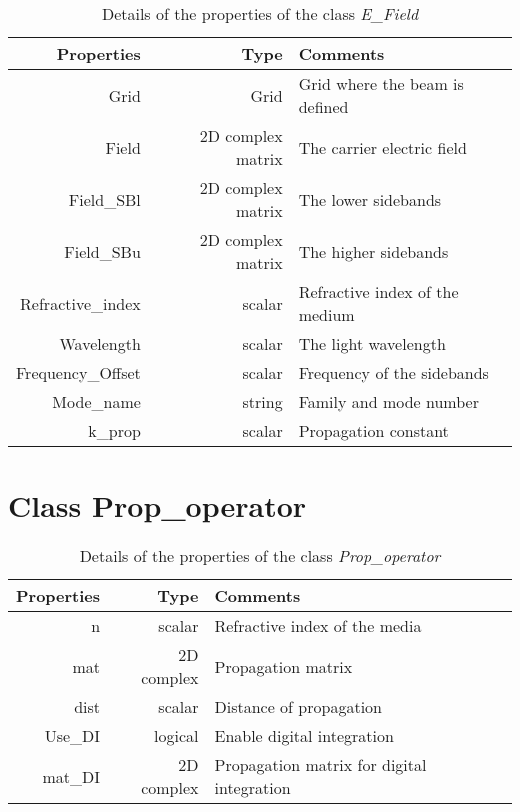 \begin{table}
  \centering
  \caption{\label{App3:E_field} Details of the properties of the class \textsl{E\_Field} }
\begin{tabular}{|r r l|}
\hline
{\Large\strut} Properties & Type &  Comments \\
\hline
{\Large\strut} Grid &  Grid & Grid where the beam is defined \\
{\Large\strut} Field &  2D complex matrix & The carrier electric field \\
{\Large\strut} Field\_SBl &  2D complex matrix & The lower sidebands \\
{\Large\strut} Field\_SBu &  2D complex matrix & The higher sidebands \\
{\Large\strut} Refractive\_index &  scalar  & Refractive index of the medium \\
{\Large\strut} Wavelength &  scalar &  The light wavelength \\
{\Large\strut} Frequency\_Offset &  scalar &  Frequency of the sidebands \\
{\Large\strut} Mode\_name &  string &  Family and mode number \\
{\Large\strut} k\_prop &  scalar & Propagation constant \\
\hline
\end{tabular}
\end{table}

\section{Class Prop\_operator}

\begin{table}
  \centering
  \caption{\label{App3:Prop_OP} Details of the properties of the class \textsl{Prop\_operator} }
\begin{tabular}{|r r l|}
\hline
{\Large\strut} Properties & Type &  Comments \\
\hline
{\Large\strut} n &  scalar & Refractive index of the media \\
{\Large\strut} mat &  2D complex & Propagation matrix \\
{\Large\strut} dist &  scalar  & Distance of propagation \\
{\Large\strut} Use\_DI &  logical & Enable digital integration \\
{\Large\strut} mat\_DI &  2D complex  & Propagation matrix for digital integration \\
\hline
\end{tabular}
\end{table}


